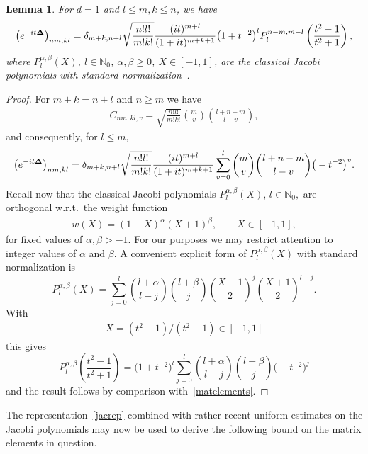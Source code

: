 \documentclass[11pt]{article}
\newtheorem{lemma}{Lemma}
\begin{document}
\begin{lemma}
\label{jacobi}
For $d=1$ and $l\leq m,k\leq n$, we have
\begin{gather}\label{jacrep}
\left(e^{-it{\bf\Delta}}\right)_{nm,kl}=
\delta_{m+k,n+l}
\sqrt{\frac{n! l!}{m! k!}}
\frac{(it)^{m+l}}{(1+it)^{m+k+1}}\big(1+t^{-2}\big)^l
  P_{l}^{n-m,m-l}\left(\frac{t^2-1}{t^2+1}\right) ,
\end{gather}
where $P_l^{\alpha,\beta}(X)$, $l\in\mathbb N_0$, $\alpha,\beta\geq 0$,
$X\in[-1,1]$, are the classical Jacobi polynomials with standard
normalization~{\rm \cite{Szego}}.
\end{lemma}

\begin{proof}
For  $m+k=n+l$ and $n\geq m$ we have
\begin{gather*}
C_{nm,kl,v}
=\sqrt{\frac{n! l!}{m! k!}}{m\choose v}{l+n-m\choose l-v},
\end{gather*}
and consequently, for $l\leq m$,
\begin{gather}
\label{matelements}
\left(e^{-it{\bf\Delta}}\right)_{nm,kl}=
\delta_{m+k,n+l}\sqrt{\frac{n! l!}{m! k!}}
\frac{(it)^{m+l}}{(1+it)^{m+k+1}}
\sum_{v=0}^{l} {m\choose v}{l+n-m\choose l-v}
 \big(-t^{-2}\big)^{v} .
\end{gather}
Recall now \cite{Szego} that the classical Jacobi polynomials
$P_l^{\alpha,\beta}(X)$, $l\in\mathbb N_0,$ are orthogonal
w.r.t.\ the weight function
\begin{gather}\label{weight}
w(X)   =  (1-X)^\alpha(X+1)^\beta,\qquad X\in[-1,1],
\end{gather}
for f\/ixed values of $\alpha, \beta > -1$. For our purposes we may
restrict attention to integer values of $\alpha$ and  $\beta$. A  convenient
explicit form of $P_l^{\alpha,\beta}(X)$ with standard normalization is
\[
P_l^{\alpha,\beta}(X)=\sum_{j=0}^l{l+\alpha\choose l-j}{l+\beta\choose
  j}\left(\frac{X-1}{2}\right)^j\left(\frac{X+1}{2}\right)^{l-j} .
\]
With
\begin{gather}\label{X-t}
X=(t^2-1)/(t^2+1)\in [-1,1]
\end{gather}
this gives
\[
P_l^{\alpha,\beta}\left(\frac{t^2-1}{t^2+1}\right)
= \big(1+t^{-2}\big)^l\sum_{j=0}^l{l+\alpha\choose l-j}
{l+\beta\choose j}\big(-t^{-2}\big)^{j}
\]
and the result follows by comparison with~\eqref{matelements}.
\end{proof}

The representation~\eqref{jacrep} combined with rather recent
uniform estimates on the Jacobi polynomials may now be used to derive the
following bound on the matrix elements in question.
\end{document}
